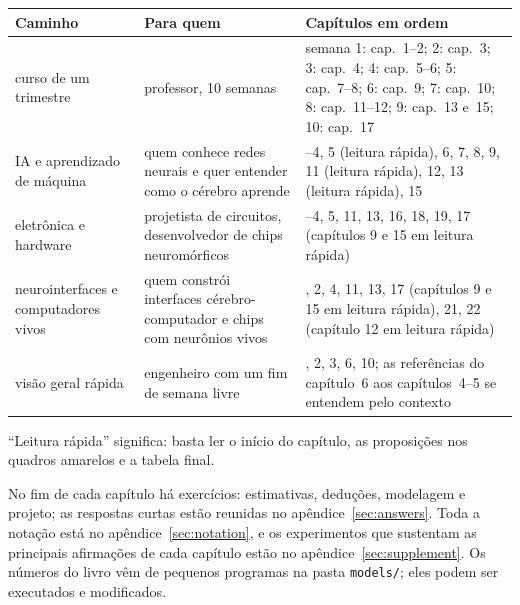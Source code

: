 \begin{center}
\footnotesize
\setlength{\tabcolsep}{4pt}
\renewcommand{\arraystretch}{1.2}
\begin{tabular}{>{\raggedright}p{3.0cm}>{\raggedright}p{3.9cm}>{\raggedright\arraybackslash}p{6.4cm}}
\toprule
Caminho & Para quem & Capítulos em ordem \\
\midrule
curso de um trimestre & professor, 10 semanas & semana 1: cap.~1--2; 2: cap.~3; 3: cap.~4; 4: cap.~5--6; 5: cap.~7--8; 6: cap.~9; 7: cap.~10; 8: cap.~11--12; 9: cap.~13 e~15; 10: cap.~17 \\
IA e aprendizado de máquina & quem conhece redes neurais e quer entender como o cérebro aprende & 1--4, 5 (leitura rápida), 6, 7, 8, 9, 11 (leitura rápida), 12, 13 (leitura rápida), 15 \\
eletrônica e hardware & projetista de circuitos, desenvolvedor de chips neuromórficos & 1--4, 5, 11, 13, 16, 18, 19, 17 (capítulos 9 e 15 em leitura rápida) \\
neurointerfaces e computadores vivos & quem constrói interfaces cérebro-computador e chips com neurônios vivos & 1, 2, 4, 11, 13, 17 (capítulos 9 e 15 em leitura rápida), 21, 22 (capítulo 12 em leitura rápida) \\
visão geral rápida & engenheiro com um fim de semana livre & 1, 2, 3, 6, 10; as referências do capítulo~6 aos capítulos~4--5 se entendem pelo contexto \\
\bottomrule
\end{tabular}
\end{center}

``Leitura rápida'' significa: basta ler o início do capítulo, as proposições nos quadros amarelos e a tabela final.

No fim de cada capítulo há exercícios: estimativas, deduções, modelagem e projeto; as respostas curtas estão reunidas no apêndice~\ref{sec:answers}. Toda a notação está no apêndice~\ref{sec:notation}, e os experimentos que sustentam as principais afirmações de cada capítulo estão no apêndice~\ref{sec:supplement}. Os números do livro vêm de pequenos programas na pasta \texttt{models/}; eles podem ser executados e modificados.
